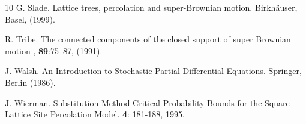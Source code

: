 \documentclass[12pt]{article}
\numberwithin{theorem}{section}
\theoremstyle{def}
\numberwithin{equation}{section}
\begin{document}
\begin{thebibliography}{10}
G. Slade.
\newblock Lattice trees, percolation and super-Brownian motion. 
\newblock Birkh\"auser, Basel, (1999).

R. Tribe.
\newblock The connected components of the closed support of super Brownian motion
, {\bf 89}:75--87, (1991).

J. Walsh.
\newblock An Introduction to Stochastic Partial Differential Equations.
\newblock Springer, Berlin (1986).

J. Wierman.
\newblock Substitution Method Critical Probability Bounds for the Square 
Lattice Site Percolation Model.
 {\bf 4}: 181-188, 1995.

\end{thebibliography}
\newpage
\appendix
\end{document}
